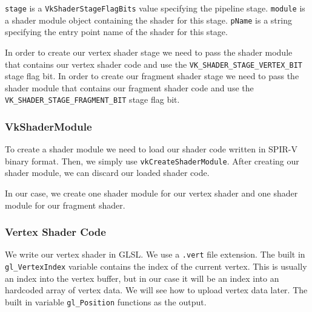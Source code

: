 \texttt{stage} is a \texttt{VkShaderStageFlagBits} value specifying the
pipeline stage.
\texttt{module} is a shader module object containing the shader for this stage.
\texttt{pName} is a string specifying the entry point name of the shader for this
stage.

In order to create our vertex shader stage we need to pass the shader module
that contains our vertex shader code and use the
\texttt{VK\_SHADER\_STAGE\_VERTEX\_BIT} stage flag bit.
In order to create our fragment shader stage we need to pass the shader module
that contains our fragment shader code and use the
\mbox{\texttt{VK\_SHADER\_STAGE\_FRAGMENT\_BIT}} stage flag bit.

\subsubsection{VkShaderModule}

To create a shader module we need to load our shader code written
in SPIR-V binary format.
Then, we simply use \texttt{vkCreateShaderModule}.
After creating our shader module, we can discard our loaded shader code.

\begin{minipage}{\linewidth}{\noindent}
    
\end{minipage}

In our case, we create one shader module for our vertex shader and one shader
module for our fragment shader.

\subsubsection{Vertex Shader Code}

We write our vertex shader in GLSL.
We use a \texttt{.vert} file extension.
The built in \texttt{gl\_VertexIndex} variable contains the index of the
current vertex.
This is usually an index into the vertex buffer, but in our case
it will be an index into an hardcoded array of vertex data.
We will see how to upload vertex data later.
The built in variable \texttt{gl\_Position} functions as the output.

\begin{minipage}{\linewidth}{\noindent}
    
\end{minipage}

